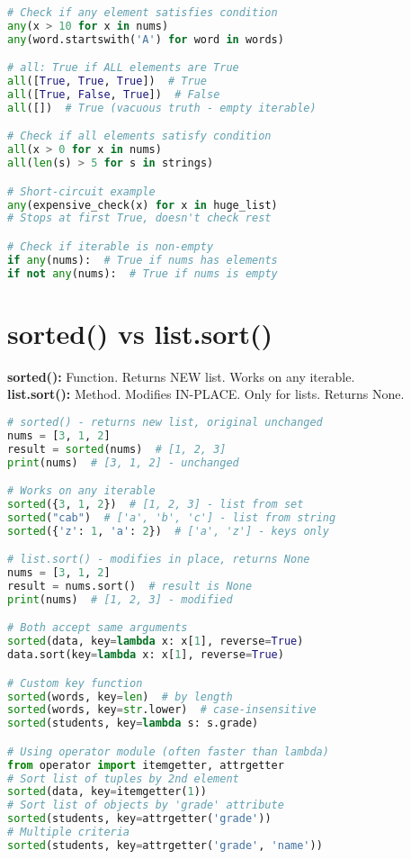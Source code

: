 \documentclass[8pt,landscape]{article}
\begin{document}
\begin{multicols}{3}
\begin{lstlisting}[language=Python]
# Check if any element satisfies condition
any(x > 10 for x in nums)
any(word.startswith('A') for word in words)

# all: True if ALL elements are True
all([True, True, True])  # True
all([True, False, True])  # False
all([])  # True (vacuous truth - empty iterable)

# Check if all elements satisfy condition
all(x > 0 for x in nums)
all(len(s) > 5 for s in strings)

# Short-circuit example
any(expensive_check(x) for x in huge_list)
# Stops at first True, doesn't check rest

# Check if iterable is non-empty
if any(nums):  # True if nums has elements
if not any(nums):  # True if nums is empty
\end{lstlisting}

\section*{sorted() vs list.sort()}
\textbf{sorted():} Function. Returns NEW list. Works on any iterable. \\
\textbf{list.sort():} Method. Modifies IN-PLACE. Only for lists. Returns None.

\begin{lstlisting}[language=Python]
# sorted() - returns new list, original unchanged
nums = [3, 1, 2]
result = sorted(nums)  # [1, 2, 3]
print(nums)  # [3, 1, 2] - unchanged

# Works on any iterable
sorted({3, 1, 2})  # [1, 2, 3] - list from set
sorted("cab")  # ['a', 'b', 'c'] - list from string
sorted({'z': 1, 'a': 2})  # ['a', 'z'] - keys only

# list.sort() - modifies in place, returns None
nums = [3, 1, 2]
result = nums.sort()  # result is None
print(nums)  # [1, 2, 3] - modified

# Both accept same arguments
sorted(data, key=lambda x: x[1], reverse=True)
data.sort(key=lambda x: x[1], reverse=True)

# Custom key function
sorted(words, key=len)  # by length
sorted(words, key=str.lower)  # case-insensitive
sorted(students, key=lambda s: s.grade)

# Using operator module (often faster than lambda)
from operator import itemgetter, attrgetter
# Sort list of tuples by 2nd element
sorted(data, key=itemgetter(1))
# Sort list of objects by 'grade' attribute
sorted(students, key=attrgetter('grade'))
# Multiple criteria
sorted(students, key=attrgetter('grade', 'name'))


\end{lstlisting}
\end{multicols}
\end{document}
